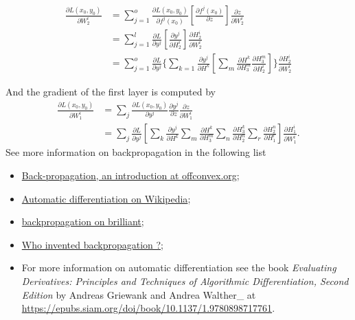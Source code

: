 \documentclass[titlestyle=hang,11pt]{elegantbook}
\begin{document}
\begin{align}
\frac{\partial L(x_0,y_0)}{\partial W_2^i}
& =\sum_{j=1}^{o}
\frac{\partial L(x_0,y_0)}{\partial f^j (x_0)}
[\frac{\partial f^j (x_0)}{\partial z}]
\frac{\partial z}{\partial W_2^i}      \\
& =\sum_{j=1}^{l}
\frac{\partial L}{\partial y^j }
[\frac{\partial y^j}{\partial H_2^i}]
\frac{\partial H_2^i}{\partial W_2^i}  \\
& =\sum_{j=1}^{o}
\frac{\partial L}{\partial y^j }
\{\sum_{k=1}\frac{\partial y^j}{\partial H^k}
[\sum_{m}\frac{\partial H^k}{\partial H_3^m}\frac{\partial H_3^m}{\partial H_2^i}]\}
\frac{\partial H_2^i}{\partial W_2^i}
\end{align}

And the gradient of the first layer is computed by
\begin{align}
\frac{\partial L(x_0,y_0)}{\partial W_1^i}
& =\sum_{j}\frac{\partial L(x_0,y_0)}{\partial y^j}\frac{\partial y^j}{\partial z}\frac{\partial z}{\partial W_1^i}                              \\
& =\sum_{j}\frac{\partial L}{\partial y^j}
[\sum_{k}\frac{\partial y^j}{\partial H^k}
\sum_{m}\frac{\partial H^k}{\partial H_3^m}
\sum_{n}\frac{\partial H_3^k}{\partial H_2^n}
\sum_{r}\frac{\partial H_2^n}{\partial H_1^r}]
\frac{\partial H_1^i}{\partial W_1^i}.
\end{align}
See more information on backpropagation in the following list
\begin{itemize}
\item \href{http://www.offconvex.org/2016/12/20/backprop/}{Back-propagation, an introduction at offconvex.org};
\item \href{https://www.wikiwand.com/en/Automatic_differentiation}{Automatic differentiation on Wikipedia};
\item \href{https://brilliant.org/wiki/backpropagation/}{backpropagation on brilliant};
\item \href{http://people.idsia.ch/~juergen/who-invented-backpropagation.html}{Who invented backpropagation ?};
\item For more information on automatic differentiation see the book \emph{Evaluating Derivatives: Principles and Techniques of Algorithmic Differentiation, Second Edition} 
      by Andreas Griewank and Andrea Walther_ at \url{https://epubs.siam.org/doi/book/10.1137/1.9780898717761}.
\end{itemize}
\end{document}
